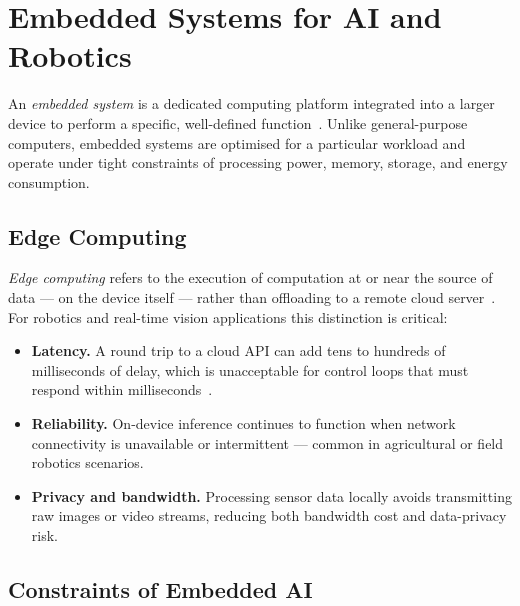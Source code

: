\section{Embedded Systems for AI and Robotics}
 
An \emph{embedded system} is a dedicated computing platform integrated
into a larger device to perform a specific, well-defined
function~\cite{heath2002embedded}. Unlike general-purpose computers,
embedded systems are optimised for a particular workload and operate
under tight constraints of processing power, memory, storage, and
energy consumption.
 
\subsection{Edge Computing}
 
\emph{Edge computing} refers to the execution of computation at or
near the source of data — on the device itself — rather than
offloading to a remote cloud server~\cite{shi2016edge}. For
robotics and real-time vision applications this distinction is
critical:
 
\begin{itemize}
    \item \textbf{Latency.} A round trip to a cloud API can add
          tens to hundreds of milliseconds of delay, which is
          unacceptable for control loops that must respond within
          milliseconds~\cite{shi2016edge}.
 
    \item \textbf{Reliability.} On-device inference continues to
          function when network connectivity is unavailable or
          intermittent — common in agricultural or field robotics
          scenarios.
 
    \item \textbf{Privacy and bandwidth.} Processing sensor data
          locally avoids transmitting raw images or video streams,
          reducing both bandwidth cost and data-privacy risk.
\end{itemize}
 
\subsection{Constraints of Embedded AI}
 
